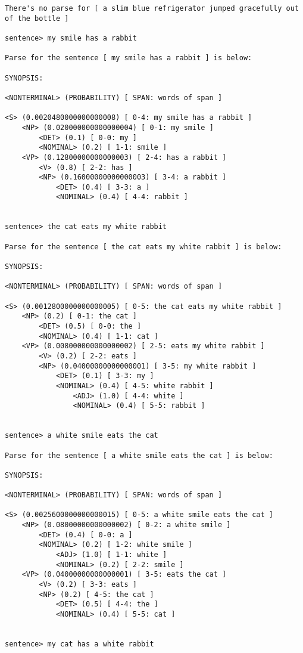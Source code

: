 \begin{verbatim}
There's no parse for [ a slim blue refrigerator jumped gracefully out of the bottle ]

sentence> my smile has a rabbit

Parse for the sentence [ my smile has a rabbit ] is below:

SYNOPSIS:

<NONTERMINAL> (PROBABILITY) [ SPAN: words of span ]

<S> (0.0020480000000000008) [ 0-4: my smile has a rabbit ]
    <NP> (0.020000000000000004) [ 0-1: my smile ]
        <DET> (0.1) [ 0-0: my ]
        <NOMINAL> (0.2) [ 1-1: smile ]
    <VP> (0.12800000000000003) [ 2-4: has a rabbit ]
        <V> (0.8) [ 2-2: has ]
        <NP> (0.16000000000000003) [ 3-4: a rabbit ]
            <DET> (0.4) [ 3-3: a ]
            <NOMINAL> (0.4) [ 4-4: rabbit ]


sentence> the cat eats my white rabbit

Parse for the sentence [ the cat eats my white rabbit ] is below:

SYNOPSIS:

<NONTERMINAL> (PROBABILITY) [ SPAN: words of span ]

<S> (0.0012800000000000005) [ 0-5: the cat eats my white rabbit ]
    <NP> (0.2) [ 0-1: the cat ]
        <DET> (0.5) [ 0-0: the ]
        <NOMINAL> (0.4) [ 1-1: cat ]
    <VP> (0.008000000000000002) [ 2-5: eats my white rabbit ]
        <V> (0.2) [ 2-2: eats ]
        <NP> (0.04000000000000001) [ 3-5: my white rabbit ]
            <DET> (0.1) [ 3-3: my ]
            <NOMINAL> (0.4) [ 4-5: white rabbit ]
                <ADJ> (1.0) [ 4-4: white ]
                <NOMINAL> (0.4) [ 5-5: rabbit ]


sentence> a white smile eats the cat

Parse for the sentence [ a white smile eats the cat ] is below:

SYNOPSIS:

<NONTERMINAL> (PROBABILITY) [ SPAN: words of span ]

<S> (0.0025600000000000015) [ 0-5: a white smile eats the cat ]
    <NP> (0.08000000000000002) [ 0-2: a white smile ]
        <DET> (0.4) [ 0-0: a ]
        <NOMINAL> (0.2) [ 1-2: white smile ]
            <ADJ> (1.0) [ 1-1: white ]
            <NOMINAL> (0.2) [ 2-2: smile ]
    <VP> (0.04000000000000001) [ 3-5: eats the cat ]
        <V> (0.2) [ 3-3: eats ]
        <NP> (0.2) [ 4-5: the cat ]
            <DET> (0.5) [ 4-4: the ]
            <NOMINAL> (0.4) [ 5-5: cat ]


sentence> my cat has a white rabbit


\end{verbatim}
